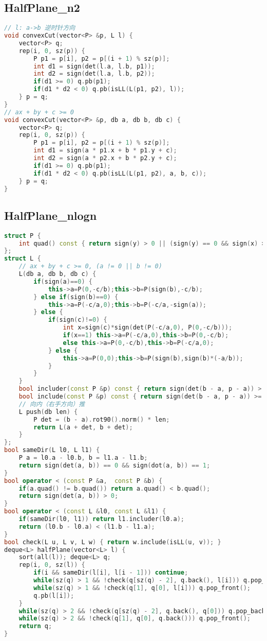 \subsection{HalfPlane\_n2}
\begin{lstlisting}[language=C++]
// l: a->b 逆时针方向  
void convexCut(vector<P> &p, L l) {
	vector<P> q;
	rep(i, 0, sz(p)) {
		P p1 = p[i], p2 = p[(i + 1) % sz(p)];
		int d1 = sign(det(l.a, l.b, p1));
		int d2 = sign(det(l.a, l.b, p2));
		if(d1 >= 0) q.pb(p1);
		if(d1 * d2 < 0) q.pb(isLL(L(p1, p2), l));
	} p = q;
}
// ax + by + c >= 0
void convexCut(vector<P> &p, db a, db b, db c) {
	vector<P> q;
	rep(i, 0, sz(p)) {
		P p1 = p[i], p2 = p[(i + 1) % sz(p)];
		int d1 = sign(a * p1.x + b * p1.y + c);
		int d2 = sign(a * p2.x + b * p2.y + c);
		if(d1 >= 0) q.pb(p1);
		if(d1 * d2 < 0) q.pb(isLL(L(p1, p2), a, b, c));
	} p = q;
}
\end{lstlisting}
\subsection{HalfPlane\_nlogn}
\begin{lstlisting}[language=C++]
struct P {
	int quad() const { return sign(y) > 0 || (sign(y) == 0 && sign(x) >= 0); }
};
struct L {
	// ax + by + c >= 0, (a != 0 || b != 0)
	L(db a, db b, db c) { 
		if(sign(a)==0) {
			this->a=P(0,-c/b);this->b=P(sign(b),-c/b);
		} else if(sign(b)==0) {
			this->a=P(-c/a,0);this->b=P(-c/a,-sign(a));
		} else {
			if(sign(c)!=0) {
				int x=sign(c)*sign(det(P(-c/a,0), P(0,-c/b)));
				if(x==1) this->a=P(-c/a,0),this->b=P(0,-c/b);
				else this->a=P(0,-c/b),this->b=P(-c/a,0);
			} else {
				this->a=P(0,0);this->b=P(sign(b),sign(b)*(-a/b));
			}
		}
	}
	bool includer(const P &p) const { return sign(det(b - a, p - a)) > 0; }
	bool include(const P &p) const { return sign(det(b - a, p - a)) >= 0; }
	// 向内（右手方向）推
	L push(db len) {
		P det = (b - a).rot90().norm() * len;
		return L(a + det, b + det);
	}
};
bool sameDir(L l0, L l1) {
	P a = l0.a - l0.b, b = l1.a - l1.b;
	return sign(det(a, b)) == 0 && sign(dot(a, b)) == 1;
}
bool operator < (const P &a,  const P &b) {
	if(a.quad() != b.quad()) return a.quad() < b.quad();
	return sign(det(a, b)) > 0;
}
bool operator < (const L &l0, const L &l1) {
	if(sameDir(l0, l1)) return l1.includer(l0.a);
	return (l0.b - l0.a) < (l1.b - l1.a);
}
bool check(L u, L v, L w) { return w.include(isLL(u, v)); }
deque<L> halfPlane(vector<L> l) {
	sort(all(l)); deque<L> q;
	rep(i, 0, sz(l)) {
		if(i && sameDir(l[i], l[i - 1])) continue;
		while(sz(q) > 1 && !check(q[sz(q) - 2], q.back(), l[i])) q.pop_back();
		while(sz(q) > 1 && !check(q[1], q[0], l[i])) q.pop_front();
		q.pb(l[i]);
	}
	while(sz(q) > 2 && !check(q[sz(q) - 2], q.back(), q[0])) q.pop_back();
	while(sz(q) > 2 && !check(q[1], q[0], q.back())) q.pop_front();
	return q;
}
\end{lstlisting}
